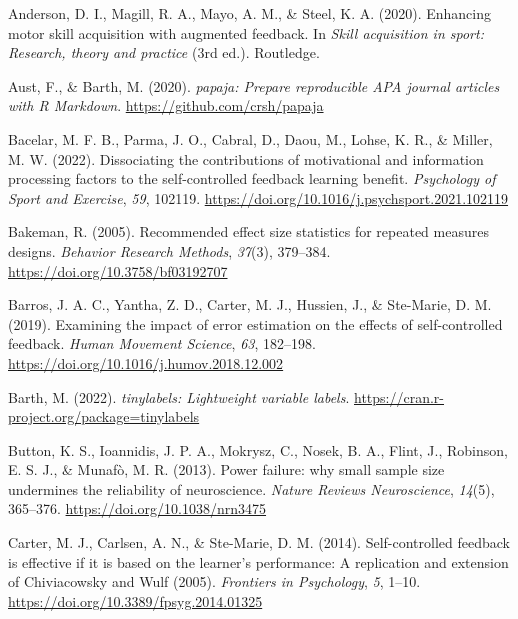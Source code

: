 \documentclass[
  doc, donotrepeattitle,floatsintext]{apa7}
\newlength{\cslhangindent}
\newlength{\cslentryspacingunit} %
\newenvironment{CSLReferences}[2] %
 {%
  \setlength{\parindent}{0pt}
  \ifodd #1
  \let\oldpar\par
  \def\par{\hangindent=\cslhangindent\oldpar}
  \fi
  \setlength{\parskip}{#2\cslentryspacingunit}
 }%
 {}
\begin{document}
\hypertarget{refs}{}
\begin{CSLReferences}{1}{0}
\leavevmode{}%
Anderson, D. I., Magill, R. A., Mayo, A. M., \& Steel, K. A. (2020). Enhancing motor skill acquisition with augmented feedback. In \emph{Skill acquisition in sport: Research, theory and practice} (3rd ed.). {Routledge}.

\leavevmode{}%
Aust, F., \& Barth, M. (2020). \emph{{papaja}: {Prepare} reproducible {APA} journal articles with {R Markdown}}. \url{https://github.com/crsh/papaja}

\leavevmode{}%
Bacelar, M. F. B., Parma, J. O., Cabral, D., Daou, M., Lohse, K. R., \& Miller, M. W. (2022). Dissociating the contributions of motivational and information processing factors to the self-controlled feedback learning benefit. \emph{Psychology of Sport and Exercise}, \emph{59}, 102119. \url{https://doi.org/10.1016/j.psychsport.2021.102119}

\leavevmode{}%
Bakeman, R. (2005). Recommended effect size statistics for repeated measures designs. \emph{Behavior Research Methods}, \emph{37}(3), 379--384. \url{https://doi.org/10.3758/bf03192707}

\leavevmode{}%
Barros, J. A. C., Yantha, Z. D., Carter, M. J., Hussien, J., \& Ste-Marie, D. M. (2019). Examining the impact of error estimation on the effects of self-controlled feedback. \emph{Human Movement Science}, \emph{63}, 182--198. \url{https://doi.org/10.1016/j.humov.2018.12.002}

\leavevmode{}%
Barth, M. (2022). \emph{{tinylabels}: Lightweight variable labels}. \url{https://cran.r-project.org/package=tinylabels}

\leavevmode{}%
Button, K. S., Ioannidis, J. P. A., Mokrysz, C., Nosek, B. A., Flint, J., Robinson, E. S. J., \& Munafò, M. R. (2013). Power failure: why small sample size undermines the reliability of neuroscience. \emph{Nature Reviews Neuroscience}, \emph{14}(5), 365--376. \url{https://doi.org/10.1038/nrn3475}

\leavevmode{}%
Carter, M. J., Carlsen, A. N., \& Ste-Marie, D. M. (2014). Self-controlled feedback is effective if it is based on the learner's performance: A replication and extension of {Chiviacowsky} and {Wulf} (2005). \emph{Frontiers in Psychology}, \emph{5}, 1--10. \url{https://doi.org/10.3389/fpsyg.2014.01325}


\end{CSLReferences}
\end{document}
